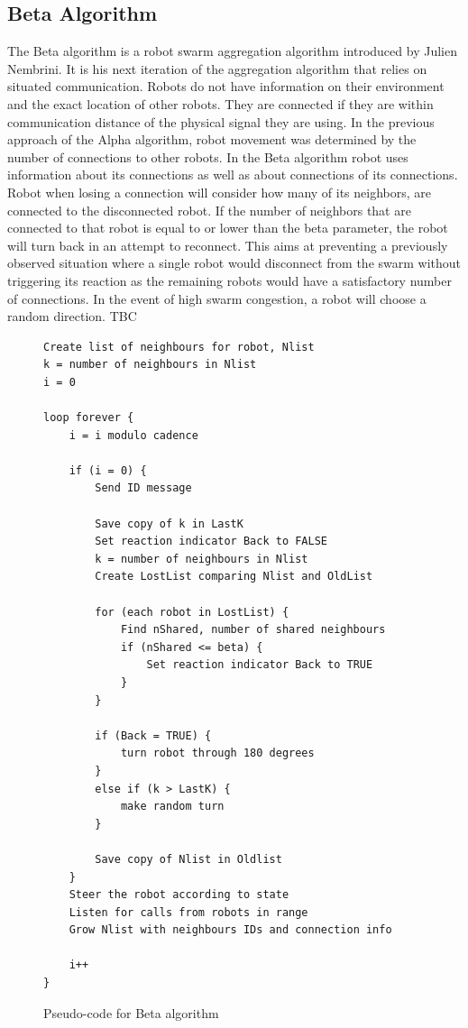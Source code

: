 \newpage
\subsection{Beta Algorithm}
The Beta algorithm is a robot swarm aggregation algorithm introduced by Julien Nembrini. It is his next iteration of the aggregation algorithm that relies on situated communication. Robots do not have information on their environment and the exact location of other robots. They are connected if they are within communication distance of the physical signal they are using. In the previous approach of the Alpha algorithm, robot movement was determined by the number of connections to other robots. In the Beta algorithm robot uses information about its connections as well as about connections of its connections. Robot when losing a connection will consider how many of its neighbors, are connected to the disconnected robot. If the number of neighbors that are connected to that robot is equal to or lower than the beta parameter, the robot will turn back in an attempt to reconnect. This aims at preventing a previously observed situation where a single robot would disconnect from the swarm without triggering its reaction as the remaining robots would have a satisfactory number of connections. In the event of high swarm congestion, a robot will choose a random direction. 
TBC

\begin{figure}[H]
\caption{Pseudo-code for Beta algorithm \cite{Nembrini2002}}
\begin{lstlisting}[style=code]
Create list of neighbours for robot, Nlist
k = number of neighbours in Nlist
i = 0

loop forever {
	i = i modulo cadence

	if (i = 0) {
		Send ID message

		Save copy of k in LastK
		Set reaction indicator Back to FALSE
		k = number of neighbours in Nlist
		Create LostList comparing Nlist and OldList

		for (each robot in LostList) {
			Find nShared, number of shared neighbours
			if (nShared <= beta) {
				Set reaction indicator Back to TRUE
			}
		}

		if (Back = TRUE) {
			turn robot through 180 degrees
		}
		else if (k > LastK) {
			make random turn
		}
		
		Save copy of Nlist in Oldlist
	}
	Steer the robot according to state
	Listen for calls from robots in range
	Grow Nlist with neighbours IDs and connection info

	i++
}
\end{lstlisting}
\label{fig:pseudocode}
\end{figure}


